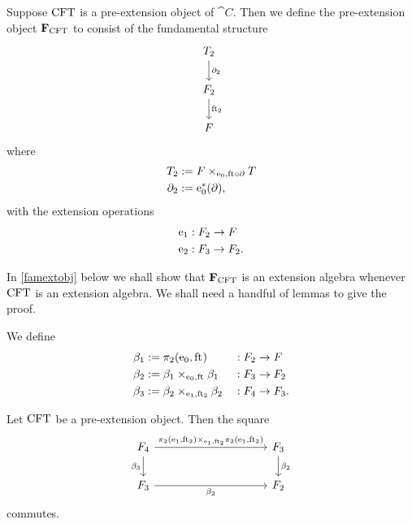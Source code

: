 \begin{defn}
Suppose $\mathrm{CFT}$ is a pre-extension object of $\cat{C}$. Then we define the pre-extension object
$\mathbf{F}_{\mathrm{CFT}}$ to consist of the fundamental structure
\begin{equation*}
\begin{tikzcd}
\stesyst_2
  \ar{d}{\ebd[2]}
  \\
\stesysf_2
  \ar{d}{\eft[2]}
  \\
\stesysf
\end{tikzcd}
\end{equation*}
where
\begin{align*}
\stesyst_2 
  & := \pullback{\stesysf}{\stesyst}{\ectxext}{\eft\circ\ebd}
  \\
\ebd[2]
  & := \ectxext^\ast(\ebd),
\end{align*}
with the extension operations
\begin{align*}
\mathrm{e}_{1} 
  & 
  : F_2\to F\\
\mathrm{e}_{2} & : F_3\to F_2.
\end{align*}
\end{defn}

In \autoref{famextobj} below we shall show that $\mathbf{F}_{\mathrm{CFT}}$ is an
extension algebra whenever $\mathrm{CFT}$ is an extension algebra. We shall need
a handful of lemmas to give the proof.

\begin{defn}
We define
\begin{align*}
\beta_1 
  & := 
\pullbackpr{2}{\ectxext}{\eft}
  & &
  : \stesysf_2\to\stesysf
  \\
\beta_2
  & :=
\pullback{\beta_1}{\beta_1}{\ectxext}{\eft}
  & &
  : \stesysf_3\to\stesysf_2
  \\
\beta_3
  & :=
\pullback{\beta_2}{\beta_2}{\efamext}{\eft[2]}
  & &
  : \stesysf_4\to\stesysf_3.
\end{align*}
\end{defn}

\begin{lem}
Let $\mathrm{CFT}$ be a pre-extension object. Then the square
\begin{equation*}
\begin{tikzcd}[column sep=10em]
\stesysf_4
  \ar{r}{\pullback{\pullbackpr{2}{\efamext}{\eft[2]}}{\pullbackpr{2}{\efamext}{\eft[2]}}{\efamext}{\eft[2]}}
  \ar{d}[swap]{\beta_3}
  &
\stesysf_3
  \ar{d}{\beta_2}
  \\
\stesysf_3
  \ar{r}[swap]{\beta_2}
  &
\stesysf_2
\end{tikzcd}
\end{equation*}
commutes.
\end{lem}

